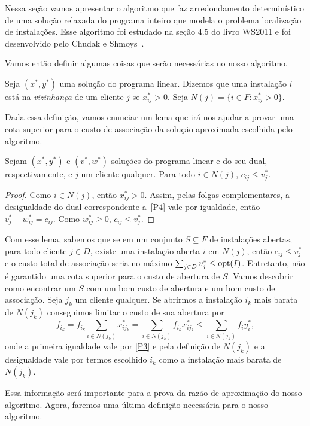 Nessa seção vamos apresentar o algoritmo que faz arredondamento determinístico de uma solução relaxada do programa inteiro que modela o problema localização de instalações. Esse algoritmo foi estudado na seção 4.5 do livro WS2011 e foi desenvolvido pelo Chudak e Shmoys~\cite{Chudak2003}.


Vamos então definir algumas coisas que serão necessárias no nosso algoritmo.
\begin{definition}
    Seja $(x^*,y^*)$ uma solução do programa linear. Dizemos que uma instalação $i$ está na \emph{vizinhança} de um cliente $j$ se $x^*_{ij} > 0$. Seja $N(j) = \{ i \in F : x^*_{ij} > 0\}$.
\end{definition}
Dada essa definição, vamos enunciar um lema que irá nos ajudar a provar uma cota superior para o custo de associação da solução aproximada escolhida pelo algoritmo.
\begin{lemma}\label{lemma:3.5}
    Sejam $(x^*,y^*)$ e $(v^*,w^*)$ soluções do programa linear e do seu dual, respectivamente, e $j$ um cliente qualquer. Para todo $i \in N(j)$, $c_{ij} \leq v^*_j$.
\end{lemma}
\begin{proof}
    Como $i \in N(j)$, então $x^*_{ij}>0$. Assim, pelas folgas complementares, a desigualdade do dual correspondente a~\eqref{P4} vale por igualdade, então $v^*_j - w^*_{ij} = c_{ij}$. Como $w^*_{ij} \geq 0$, $c_{ij} \leq v^*_j$. 
\end{proof}
Com esse lema, sabemos que se em um conjunto $S \subseteq F$ de instalações abertas, para todo cliente $j \in D$, existe uma instalação aberta $i$ em $N(j)$, então $c_{ij}\leq v_j^*$ e o custo total de associação seria no máximo $\sum_{j\in D}v_j^* \leq \mathrm{opt}(I)$. Entretanto, não é garantido uma cota superior para o custo de abertura de $S$. Vamos descobrir como encontrar um $S$ com um bom custo de abertura e um bom custo de associação. Seja $j_k$ um cliente qualquer. Se abrirmos a instalação $i_k$ mais barata de $N(j_k)$ conseguimos limitar o custo de sua abertura por
\[\tag{*} \label{relx_fl:*}
    f_{i_k} = f_{i_k} \sum_{i \in N(j_k)}x^*_{ij_k} = \sum_{i \in N(j_k)}f_{i_k}x^*_{ij_k} \leq \sum_{i \in N(j_k)}f_{i}y^*_{i},
\]
onde a primeira igualdade vale por \eqref{P3} e pela definição de $N(j_k)$ e a desigualdade vale por termos escolhido $i_k$ como a instalação mais barata de $N(j_k)$.

Essa informação será importante para a prova da razão de aproximação do nosso algoritmo. Agora, faremos uma última definição necessária para o nosso algoritmo.

